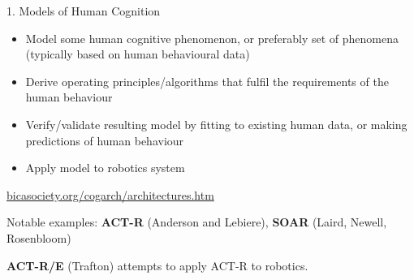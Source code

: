 \documentclass[compress]{beamer}
\begin{document}
\begin{frame}{1. Models of Human Cognition}    

    \begin{itemize}
        \item Model some human cognitive phenomenon, or preferably set of phenomena (typically based on human behavioural data)
        \item Derive operating principles/algorithms that fulfil the requirements of the human behaviour
        \item Verify/validate resulting model by fitting to existing human data, or making predictions of human behaviour
        \item Apply model to robotics system
    \end{itemize}

    \pause

    \href{http://bicasociety.org/cogarch/architectures.htm}{bicasociety.org/cogarch/architectures.htm}

    Notable examples: \textbf{ACT-R} (Anderson and Lebiere), \textbf{SOAR} (Laird, Newell, Rosenbloom)

    \pause

    \textbf{ACT-R/E} (Trafton) attempts to apply ACT-R to robotics.
    
\end{frame}
\end{document}
